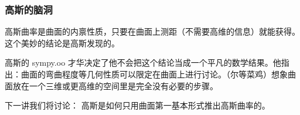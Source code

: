 \documentclass[CJK,13pt]{beamer}
\begin{document}
\begin{frame}
  \frametitle{高斯的脑洞}
  {\blue 高斯曲率是曲面的内禀性质，只要在曲面上测距（不需要高维的信息）就能获得。}这个美妙的结论是高斯发现的。

  \skiplines
  
  高斯的 sympy.oo 才华决定了他不会把这个结论当成一个平凡的数学结果。他指出：曲面的弯曲程度等几何性质可以限定在曲面上进行讨论。{\blue（尔等菜鸡）想象曲面放在一个三维或更高维的空间里是完全没有必要的步骤。}


  
\end{frame}


\begin{frame}
  下一讲我们将讨论： 高斯是如何只用曲面第一基本形式推出高斯曲率的。
  
  

\end{frame}

\ech
\end{document}
